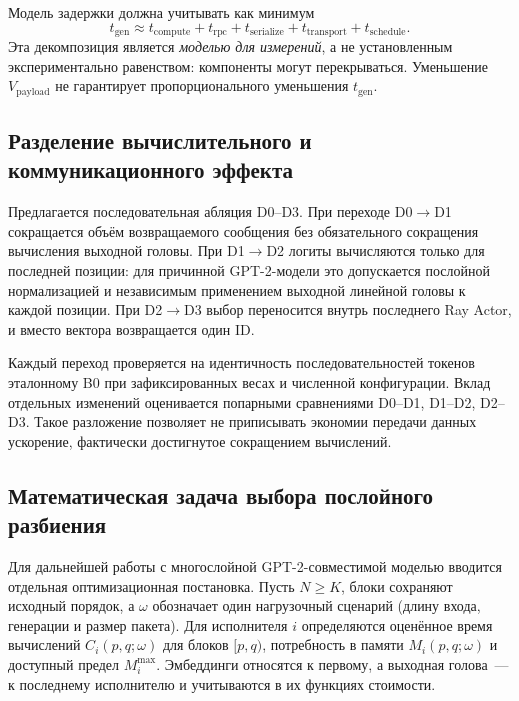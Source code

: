 Модель задержки должна учитывать как минимум
\begin{equation}
 t_{\mathrm{gen}}\approx t_{\mathrm{compute}}+t_{\mathrm{rpc}}
 +t_{\mathrm{serialize}}+t_{\mathrm{transport}}+t_{\mathrm{schedule}}.
 \label{eq:latency}
\end{equation}
Эта декомпозиция является \emph{моделью для измерений}, а не установленным экспериментально равенством: компоненты могут перекрываться. Уменьшение $V_{\mathrm{payload}}$ не гарантирует пропорционального уменьшения $t_{\mathrm{gen}}$.

\subsection{Разделение вычислительного и коммуникационного эффекта}

Предлагается последовательная абляция D0--D3. При переходе D0$\to$D1 сокращается объём возвращаемого сообщения без обязательного сокращения вычисления выходной головы. При D1$\to$D2 логиты вычисляются только для последней позиции: для причинной GPT-2-модели это допускается послойной нормализацией и независимым применением выходной линейной головы к каждой позиции. При D2$\to$D3 выбор  переносится внутрь последнего Ray Actor, и вместо вектора возвращается один ID.

Каждый переход проверяется на идентичность последовательностей токенов эталонному B0 при зафиксированных весах и численной конфигурации. Вклад отдельных изменений оценивается попарными сравнениями D0--D1, D1--D2, D2--D3. Такое разложение позволяет не приписывать экономии передачи данных ускорение, фактически достигнутое сокращением вычислений.

\subsection{Математическая задача выбора послойного разбиения}

Для дальнейшей работы с многослойной GPT-2-совместимой моделью вводится отдельная оптимизационная постановка. Пусть $N\ge K$, блоки сохраняют исходный порядок, а $\omega$ обозначает один нагрузочный сценарий (длину входа, генерации и размер пакета). Для исполнителя $i$ определяются оценённое время вычислений $C_i(p,q;\omega)$ для блоков $[p,q)$, потребность в памяти $M_i(p,q;\omega)$ и доступный предел $M_i^{\max}$. Эмбеддинги относятся к первому, а выходная голова~--- к последнему исполнителю и учитываются в их функциях стоимости.

